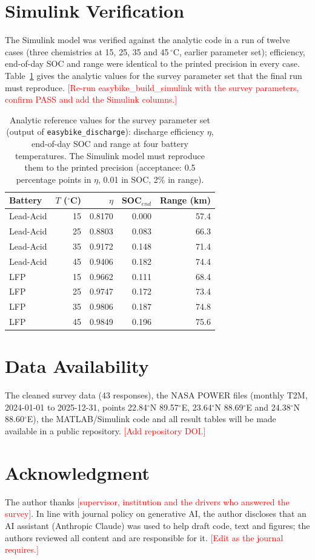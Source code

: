 \documentclass[11pt,a4paper]{article}
\newcommand{\todo}[1]{\textcolor{red}{#1}}%
\begin{document}
\section{Simulink Verification}
\label{app:sim}
The Simulink model was verified against the analytic code in a run of twelve cases (three chemistries at 15, 25, 35 and 45\,$^\circ$C, earlier parameter set); efficiency, end-of-day SOC and range were identical to the printed precision in every case. Table~\ref{tab:sim} gives the analytic values for the survey parameter set that the final run must reproduce. \todo{[Re-run easybike\_build\_simulink with the survey parameters, confirm PASS and add the Simulink columns.]}
\begin{table}[t]
\caption{Analytic reference values for the survey parameter set (output of \texttt{easybike\_discharge}): discharge efficiency $\eta$, end-of-day SOC and range at four battery temperatures. The Simulink model must reproduce them to the printed precision (acceptance: 0.5 percentage points in $\eta$, 0.01 in SOC, 2\% in range).}
\label{tab:sim}
\centering\footnotesize
\begin{tabular}{lrrrr}
\hline
Battery & $T$ ($^\circ$C) & $\eta$ & SOC$_{end}$ & Range (km) \\
\hline
Lead-Acid & 15 & 0.8170 & 0.000 & 57.4 \\
Lead-Acid & 25 & 0.8803 & 0.083 & 66.3 \\
Lead-Acid & 35 & 0.9172 & 0.148 & 71.4 \\
Lead-Acid & 45 & 0.9406 & 0.182 & 74.4 \\
LFP & 15 & 0.9662 & 0.111 & 68.4 \\
LFP & 25 & 0.9747 & 0.172 & 73.4 \\
LFP & 35 & 0.9806 & 0.187 & 74.8 \\
LFP & 45 & 0.9849 & 0.196 & 75.6 \\
\hline
\end{tabular}
\end{table}


\section*{Data Availability}
The cleaned survey data (43 responses), the NASA POWER files (monthly T2M, 2024-01-01 to 2025-12-31, points 22.84$^\circ$N 89.57$^\circ$E, 23.64$^\circ$N 88.69$^\circ$E and 24.38$^\circ$N 88.60$^\circ$E), the MATLAB/Simulink code and all result tables will be made available in a public repository. \todo{[Add repository DOI.]}
\section*{Acknowledgment}
The author thanks \todo{[supervisor, institution and the drivers who answered the survey]}. In line with journal policy on generative AI, the author discloses that an AI assistant (Anthropic Claude) was used to help draft code, text and figures; the authors reviewed all content and are responsible for it. \todo{[Edit as the journal requires.]}


\end{document}
